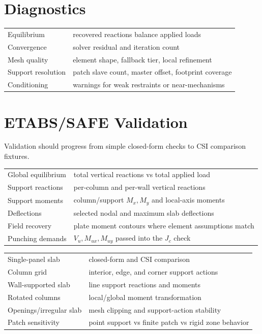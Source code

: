 \documentclass[10pt]{article}
\begin{document}
\section{Diagnostics}

{\ttfamily\footnotesize
\begin{tabular}{@{}p{2.0in}p{4.5in}@{}}
Equilibrium & recovered reactions balance applied loads \\
Convergence & solver residual and iteration count \\
Mesh quality & element shape, fallback tier, local refinement \\
Support resolution & patch slave count, master offset, footprint coverage \\
Conditioning & warnings for weak restraints or near-mechanisms \\
\end{tabular}
}

\section{ETABS/SAFE Validation}

Validation should progress from simple closed-form checks to CSI comparison
fixtures.


{\ttfamily\footnotesize
\begin{tabular}{@{}p{1.8in}p{4.7in}@{}}
Global equilibrium & total vertical reactions vs total applied load \\
Support reactions & per-column and per-wall vertical reactions \\
Support moments & column/support $M_x,M_y$ and local-axis moments \\
Deflections & selected nodal and maximum slab deflections \\
Field recovery & plate moment contours where element assumptions match \\
Punching demands & $V_u,M_{ux},M_{uy}$ passed into the $J_c$ check \\
\end{tabular}
}


{\ttfamily\footnotesize
\begin{tabular}{@{}p{1.8in}p{4.7in}@{}}
Single-panel slab & closed-form and CSI comparison \\
Column grid & interior, edge, and corner support actions \\
Wall-supported slab & line support reactions and moments \\
Rotated columns & local/global moment transformation \\
Openings/irregular slab & mesh clipping and support-action stability \\
Patch sensitivity & point support vs finite patch vs rigid zone behavior \\
\end{tabular}
}
\end{document}
